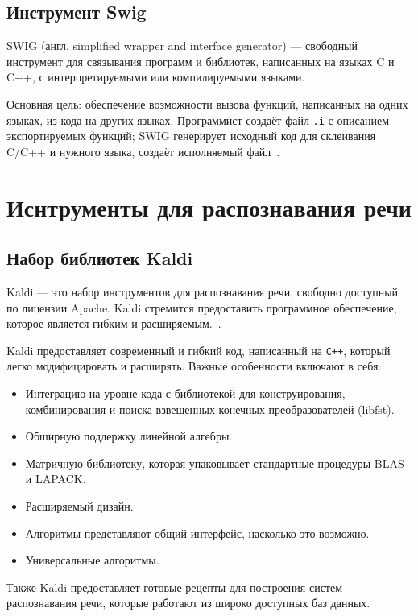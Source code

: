 \subsection{Инструмент Swig}
SWIG (англ. simplified wrapper and interface generator) — свободный инструмент
для связывания программ и библиотек, написанных на языках C и C++, с
интерпретируемыми или компилируемыми языками.

Основная цель: обеспечение возможности вызова
функций, написанных на одних языках, из кода на других языках. Программист
создаёт файл \texttt{.i} с описанием экспортируемых функций; SWIG генерирует исходный код
для склеивания C/C++ и нужного языка, создаёт исполняемый файл~\cite{swig}.



\section{Иснтрументы для распознавания речи}

\subsection{Набор библиотек Kaldi}
Kaldi --- это набор инструментов для распознавания речи, свободно доступный по
лицензии Apache. Kaldi стремится предоставить программное обеспечение, которое
является гибким и расширяемым.~\cite{kaldi}.

Kaldi предоставляет современный и гибкий код, написанный на \texttt{C++}, который
легко модифицировать и расширять. Важные особенности включают в себя:

\begin{itemize}
    \item Интеграцию на уровне кода с библиотекой для конструирования, комбинирования
        и поиска взвешенных конечных преобразователей (libfst).
    \item Обширную поддержку линейной алгебры.
    \item Матричную библиотеку, которая упаковывает стандартные процедуры BLAS и LAPACK.
    \item Расширяемый дизайн.
    \item Алгоритмы представляют общий интерфейс, насколько это возможно.
    \item Универсальные алгоритмы.
\end{itemize}

Также Kaldi предоставляет готовые рецепты для построения систем \\
\mbox{распознавания} речи, которые работают из широко доступных баз данных.

